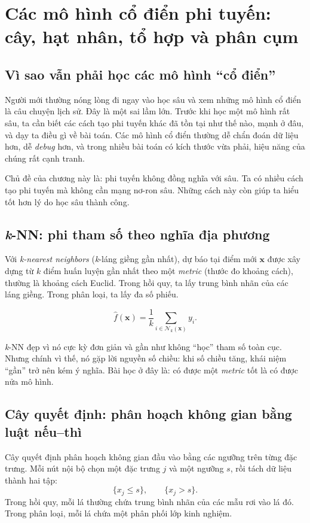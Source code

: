 \chapter{Các mô hình cổ điển phi tuyến: cây, hạt nhân, tổ hợp và phân cụm}

\section{Vì sao vẫn phải học các mô hình ``cổ điển''}

Người mới thường nóng lòng đi ngay vào học sâu và xem những mô hình cổ điển là câu chuyện lịch sử. Đây là một sai lầm lớn. Trước khi học một mô hình rất sâu, ta cần biết các cách tạo phi tuyến khác đã tồn tại như thế nào, mạnh ở đâu, và dạy ta điều gì về bài toán. Các mô hình cổ điển thường dễ chẩn đoán dữ liệu hơn, dễ \emph{debug} hơn, và trong nhiều bài toán có kích thước vừa phải, hiệu năng của chúng rất cạnh tranh.

Chủ đề của chương này là: phi tuyến không đồng nghĩa với sâu. Ta có nhiều cách tạo phi tuyến mà không cần mạng nơ-ron sâu. Những cách này còn giúp ta hiểu tốt hơn lý do học sâu thành công.

\section{\emph{k}-NN: phi tham số theo nghĩa địa phương}

Với \emph{k-nearest neighbors} (\emph{k}-láng giềng gần nhất), dự báo tại điểm mới \(\bm{x}\) được xây dựng từ \(k\) điểm huấn luyện gần nhất theo một \emph{metric} (thước đo khoảng cách), thường là khoảng cách Euclid. Trong hồi quy, ta lấy trung bình nhãn của các láng giềng. Trong phân loại, ta lấy đa số phiếu.

\[
\hat{f}(\bm{x}) = \frac{1}{k}\sum_{i\in \mathcal{N}_k(\bm{x})} y_i.
\]

\emph{k}-NN đẹp vì nó cực kỳ đơn giản và gần như không ``học'' tham số toàn cục. Nhưng chính vì thế, nó gặp lời nguyền số chiều: khi số chiều tăng, khái niệm ``gần'' trở nên kém ý nghĩa. Bài học ở đây là: có được một \emph{metric} tốt là có được nửa mô hình.

\section{Cây quyết định: phân hoạch không gian bằng luật nếu--thì}

Cây quyết định phân hoạch không gian đầu vào bằng các ngưỡng trên từng đặc trưng. Mỗi nút nội bộ chọn một đặc trưng \(j\) và một ngưỡng \(s\), rồi tách dữ liệu thành hai tập:
\[
\{x_j \le s\},\qquad \{x_j > s\}.
\]
Trong hồi quy, mỗi lá thường chứa trung bình nhãn của các mẫu rơi vào lá đó. Trong phân loại, mỗi lá chứa một phân phối lớp kinh nghiệm.


